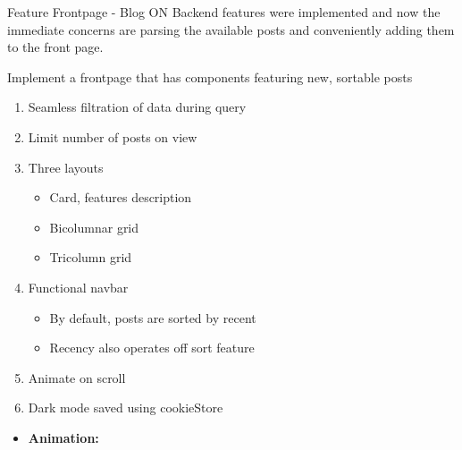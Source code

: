 \documentclass[7px]{article}
\begin{document}
\frontmatter
{Feature}
{Frontpage - Blog}
{ON}
{Backend features were implemented and now the immediate concerns are parsing the available posts and conveniently adding them to the front page.}

\strategy
{Implement a frontpage that has components featuring new, sortable posts}
{
  \begin{enumerate}
    \item Seamless filtration of data during query
    \item Limit number of posts on view
    \item Three layouts
      \small{
        \begin{itemize}[label=$\multimapdotinv$, leftmargin=1.7mm]
          \item Card, features description
          \item Bicolumnar grid
          \item Tricolumn grid
        \end{itemize}
      }
      \normalsize
    \item Functional navbar
      \small{
        \begin{itemize}[label=$\multimapdotinv$, leftmargin=1.7mm]
          \item By default, posts are sorted by recent
          \item Recency also operates off sort feature
        \end{itemize}
      }
    \item Animate on scroll
    \item Dark mode saved using cookieStore
  \end{enumerate}
}
{
  \begin{itemize}[label=\textsection]
    \item {\textbf{Animation: }}
      \small
  \end{itemize}
}
\end{document}
